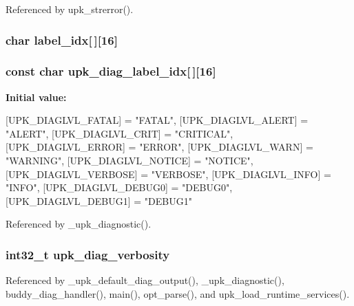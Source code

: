 Referenced by upk\_\-strerror().

\subsubsection[{label\_\-idx}]{\setlength{\rightskip}{0pt plus 5cm}char {\bf label\_\-idx}[$\,$][16]}\label{group__upk__errors_ga9d2bce202c2ba97f9c8c02d46857552a}
\subsubsection[{upk\_\-diag\_\-label\_\-idx}]{\setlength{\rightskip}{0pt plus 5cm}const char {\bf upk\_\-diag\_\-label\_\-idx}[$\,$][16]\hspace{0.3cm}{\ttfamily  [static]}}\label{group__upk__errors_gae422812b612ba3ecf5f411f023416c38}
{\bfseries Initial value:}
\begin{DoxyCode}
 {
    [UPK_DIAGLVL_FATAL] = "FATAL",
    [UPK_DIAGLVL_ALERT] = "ALERT",
    [UPK_DIAGLVL_CRIT] = "CRITICAL",
    [UPK_DIAGLVL_ERROR] = "ERROR",
    [UPK_DIAGLVL_WARN] = "WARNING",
    [UPK_DIAGLVL_NOTICE] = "NOTICE",
    [UPK_DIAGLVL_VERBOSE] = "VERBOSE",
    [UPK_DIAGLVL_INFO] = "INFO",
    [UPK_DIAGLVL_DEBUG0] = "DEBUG0",
    [UPK_DIAGLVL_DEBUG1] = "DEBUG1"
}
\end{DoxyCode}


Referenced by \_\-upk\_\-diagnostic().

\subsubsection[{upk\_\-diag\_\-verbosity}]{\setlength{\rightskip}{0pt plus 5cm}int32\_\-t {\bf upk\_\-diag\_\-verbosity}}\label{group__upk__errors_gad9883b6b44bf3fa3e1abac4266ca1b65}


Referenced by \_\-upk\_\-default\_\-diag\_\-output(), \_\-upk\_\-diagnostic(), buddy\_\-diag\_\-handler(), main(), opt\_\-parse(), and upk\_\-load\_\-runtime\_\-services().

